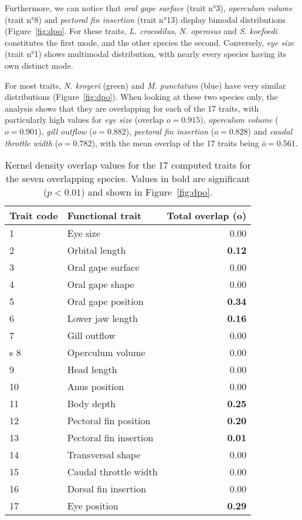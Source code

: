 Furthermore, we can notice that \emph{oral gape surface} (trait n°3), \emph{operculum volume} (trait n°8) and \emph{pectoral fin insertion} (trait n°13) display bimodal distributions (Figure~\ref{fig:dpo}. For these traits, \textit{L. crocodilus}, \textit{N. operosus} and \textit{S. koefoedi} constitutes the first mode, and the other species the second. Conversely, \emph{eye size} (trait n°1) shows multimodal distribution, with nearly every species having its own distinct mode.

For most traits, \textit{N. kroyeri} (green) and \textit{M. punctatum} (blue) have very similar distributions (Figure~\ref{fig:dpo}). When looking at these two species only, the analysis shows that they are overlapping for each of the 17 traits, with particularly high values for \emph{eye size} (overlap $o = 0.915$), \emph{operculum volume} ($o = 0.901$), \emph{gill outflow} ($o = 0.882$), \emph{pectoral fin insertion} ($o = 0.828$) and \emph{caudal throttle width} ($o = 0.782$), with the mean overlap of the 17 traits being $\bar{o} = 0.561$.


\begin{table}[!htbp]
\centering
\caption[Kernel density overlap values for the 17 traits]{Kernel density overlap values for the 17 computed traits for the seven overlapping species. Values in bold are significant ($p < 0.01$) and shown in Figure~\ref{fig:dpo}.}
\label{table:kern_over_val}
\begin{tabular}{llr}
  \toprule
Trait code & Functional trait & Total overlap (o) \\ 
  \midrule
1 & Eye size & 0.00 \\ 
  2 & Orbital length & \textbf{0.12} \\ 
  3 & Oral gape surface & 0.00 \\ 
  4 & Oral gape shape &0.00 \\ 
  5 & Oral gape position & \textbf{0.34} \\ 
  6 & Lower jaw length & \textbf{0.16} \\ 
  7 & Gill outflow & 0.00 \\ s
  8 & Operculum volume & 0.00 \\ 
  9 & Head length & 0.00 \\ 
  10 & Anus position & 0.00 \\ 
  11 & Body depth & \textbf{0.25} \\ 
  12 & Pectoral fin position & \textbf{0.20} \\ 
  13 & Pectoral fin insertion & \textbf{0.01} \\ 
  14 & Transversal shape & 0.00 \\ 
  15 & Caudal throttle width & 0.00 \\ 
  16 & Dorsal fin insertion & 0.00 \\ 
  17 & Eye position & \textbf{0.29} \\ 
   \bottomrule
\end{tabular}
\end{table} 

